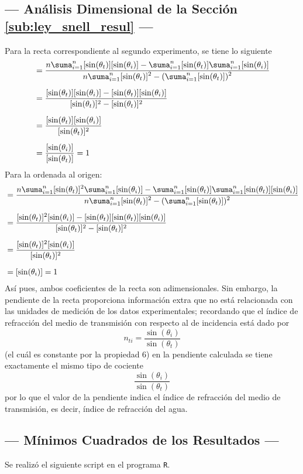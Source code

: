 \documentclass[12pt,a4paper]{article}
\begin{document}
\subsection{--- Análisis Dimensional de la Sección \ref{sub:ley_snell_resul} ---} %
\label{sub:analisis_dim_snell}
Para la recta correspondiente al segundo experimento, se tiene lo siguiente
\begin{align*}
	[a]&=\dfrac{n\displaystyle\suma_{i=1}^{n}[\sin(\theta_t)][\sin(\theta_i)]-\displaystyle\suma_{i=1}^{n}[\sin(\theta_t)]\displaystyle\suma_{i=1}^{n}[\sin(\theta_i)]}{n\displaystyle\suma_{i=1}^{n}[\sin(\theta_t)]^2-(\displaystyle\suma_{i=1}^{n}[\sin(\theta_t)])^2}\\[2mm]
	&=\dfrac{[\sin(\theta_t)][\sin(\theta_i)]-[\sin(\theta_t)][\sin(\theta_i)]}{[\sin(\theta_t)]^2-[\sin(\theta_t)]^2}\\[2mm]
	&=\dfrac{[\sin(\theta_t)][\sin(\theta_i)]}{[\sin(\theta_t)]^2}\\[2mm]
	&=\dfrac{[\sin(\theta_i)]}{[\sin(\theta_t)]}=1
\end{align*} 
Para la ordenada al origen:
\begin{align*}
	[b]&=\dfrac{n\displaystyle\suma_{i=1}^{n}[\sin(\theta_t)]^2\displaystyle\suma_{i=1}^{n}[\sin(\theta_i)]-\displaystyle\suma_{i=1}^{n}[\sin(\theta_t)]\displaystyle\suma_{i=1}^{n}[\sin(\theta_t)][\sin(\theta_i)]}{n\displaystyle\suma_{i=1}^{n}[\sin(\theta_t)]^2-(\displaystyle\suma_{i=1}^{n}[\sin(\theta_t)])^2}\\[2mm]
	&=\dfrac{[\sin(\theta_t)]^2[\sin(\theta_i)]-[\sin(\theta_t)][\sin(\theta_t)][\sin(\theta_i)]}{[\sin(\theta_t)]^2-[\sin(\theta_t)]^2}\\[2mm]
	&=\dfrac{[\sin(\theta_t)]^2[\sin(\theta_i)]}{[\sin(\theta_t)]^2}\\[2mm]
	&=[\sin(\theta_i)]=1
\end{align*} 
Así pues, ambos coeficientes de la recta son adimensionales. Sin embargo, la pendiente de la recta proporciona información extra que no está relacionada con las unidades de medición de los datos experimentales; recordando que el índice de refracción del medio de transmisión con respecto al de incidencia está dado por 
$$n_{ti}=\dfrac{\sin(\theta_i)}{\sin(\theta_t)}$$
(el cuál es constante por la propiedad 6) en la pendiente calculada se tiene exactamente el mismo tipo de cociente
$$\dfrac{\sin(\theta_i)}{\sin(\theta_t)}$$
por lo que el valor de la pendiente indica el índice de refracción del medio de transmisión, es decir, índice de refracción del agua.

\subsection{--- Mínimos Cuadrados de los Resultados ---} %
\label{sub:minimos_cuadrados}
Se realizó el siguiente script en el programa \texttt{R}.


\end{document}
